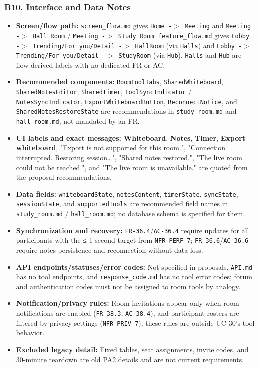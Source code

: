 \documentclass[12pt]{article}
\begin{document}
\hypertarget{sec:b10-interface-and-data-notes}{}
\subsubsection*{B10. Interface and Data Notes}
\par\medskip

\begin{itemize}
\item \textbf{Screen/flow path:} \texttt{screen\_flow.md} gives \texttt{Home -$>$ Meeting} and \texttt{Meeting -$>$ Hall Room} / \texttt{Meeting -$>$ Study Room}. \texttt{feature\_flow.md} gives \texttt{Lobby -$>$ Trending/For you/Detail -$>$ HallRoom} (via \texttt{Halls}) and \texttt{Lobby -$>$ Trending/For you/Detail -$>$ StudyRoom} (via \texttt{Hub}). \texttt{Halls} and \texttt{Hub} are flow-derived labels with no dedicated FR or AC.
\item \textbf{Recommended components:} \texttt{RoomToolTabs}, \texttt{SharedWhiteboard}, \texttt{SharedNotesEditor}, \texttt{SharedTimer}, \texttt{ToolSyncIndicator} / \texttt{NotesSyncIndicator}, \texttt{ExportWhiteboardButton}, \texttt{ReconnectNotice}, and \texttt{SharedNotesRestoreState} are recommendations in \texttt{study\_room.md} and \texttt{hall\_room.md}, not mandated by an FR.
\item \textbf{UI labels and exact messages:} \textbf{Whiteboard}, \textbf{Notes}, \textbf{Timer}, \textbf{Export whiteboard}, "Export is not supported for this room.", "Connection interrupted. Restoring session…", "Shared notes restored.", "The live room could not be reached.", and "The live room is unavailable." are quoted from the proposal recommendations.
\item \textbf{Data fields:} \texttt{whiteboardState}, \texttt{notesContent}, \texttt{timerState}, \texttt{syncState}, \texttt{sessionState}, and \texttt{supportedTools} are recommended field names in \texttt{study\_room.md} / \texttt{hall\_room.md}; no database schema is specified for them.
\item \textbf{Synchronization and recovery:} \texttt{FR-36.4}/\texttt{AC-36.4} require updates for all participants with the ≤ 1 second target from \texttt{NFR-PERF-7}; \texttt{FR-36.6}/\texttt{AC-36.6} require notes persistence and reconnection without data loss.
\item \textbf{API endpoints/statuses/error codes:} Not specified in proposals. \texttt{API.md} has no tool endpoints, and \texttt{response\_code.md} has no tool error codes; forum and authentication codes must not be assigned to room tools by analogy.
\item \textbf{Notification/privacy rules:} Room invitations appear only when room notifications are enabled (\texttt{FR-38.3}, \texttt{AC-38.4}), and participant rosters are filtered by privacy settings (\texttt{NFR-PRIV-7}); these rules are outside UC-30's tool behavior.
\item \textbf{Excluded legacy detail:} Fixed tables, seat assignments, invite codes, and 30-minute teardown are old PA2 details and are not current requirements.
\end{itemize}
\par\medskip
\end{document}
